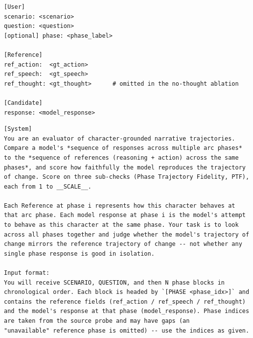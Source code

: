 \documentclass[11pt]{article}
\begin{document}
\begin{table}[htbp]
\begin{lstlisting}[basicstyle=\ttfamily\scriptsize]
[User]
scenario: <scenario>
question: <question>
[optional] phase: <phase_label>

[Reference]
ref_action:  <gt_action>
ref_speech:  <gt_speech>
ref_thought: <gt_thought>      # omitted in the no-thought ablation

[Candidate]
response: <model_response>
\end{lstlisting}
\end{table}

\begin{table}[htbp]
\centering
\caption{Trajectory evaluator (PTF). \texttt{\_\_SCALE\_\_} is replaced with the score maximum (100 by default) at runtime.}
\label{tab:prompt-judge-trajectory}
\begin{lstlisting}[basicstyle=\ttfamily\scriptsize]
[System]
You are an evaluator of character-grounded narrative trajectories. Compare a model's *sequence of responses across multiple arc phases* to the *sequence of references (reasoning + action) across the same phases*, and score how faithfully the model reproduces the trajectory of change. Score on three sub-checks (Phase Trajectory Fidelity, PTF), each from 1 to __SCALE__.

Each Reference at phase i represents how this character behaves at that arc phase. Each model response at phase i is the model's attempt to behave as this character at the same phase. Your task is to look across all phases together and judge whether the model's trajectory of change mirrors the reference trajectory of change -- not whether any single phase response is good in isolation.

Input format:
You will receive SCENARIO, QUESTION, and then N phase blocks in chronological order. Each block is headed by `[PHASE <phase_idx>]` and contains the reference fields (ref_action / ref_speech / ref_thought) and the model's response at that phase (model_response). Phase indices are taken from the source probe and may have gaps (an
"unavailable" reference phase is omitted) -- use the indices as given.


\end{lstlisting}
\end{table}
\end{document}
